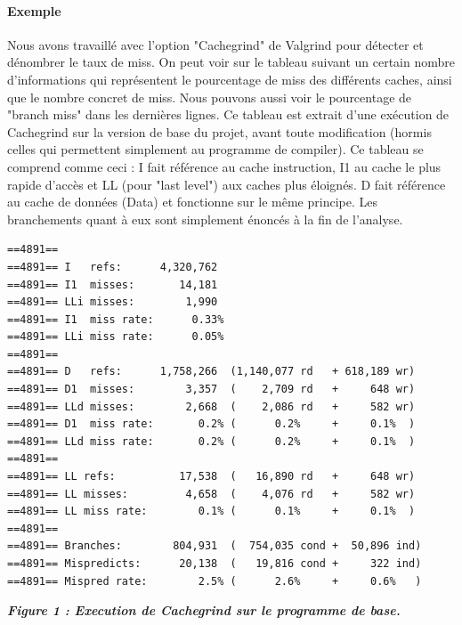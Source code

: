 \documentclass{report}
\begin{document}
\paragraph{Exemple}
Nous avons travaillé avec l'option "Cachegrind" de Valgrind pour détecter et dénombrer le taux de miss.
On peut voir sur le tableau suivant un certain nombre d'informations qui représentent le pourcentage de miss des différents caches, ainsi que le nombre concret de miss. 
Nous pouvons aussi voir le pourcentage de "branch miss" dans les dernières lignes. 
Ce tableau est extrait d'une exécution de Cachegrind sur la version de base du projet, avant toute modification (hormis celles qui permettent simplement au programme de compiler).
Ce tableau se comprend comme ceci :
\newline
I fait référence au cache instruction, I1 au cache le plus rapide d'accès et LL (pour "last level") aux caches plus éloignés.
\newline
D fait référence au cache de données (Data) et fonctionne sur le même principe.
Les branchements quant à eux sont simplement énoncés à la fin de l'analyse.
\newpage
\begin{scriptsize}
\begin{lstlisting}
==4891== 
==4891== I   refs:      4,320,762
==4891== I1  misses:       14,181
==4891== LLi misses:        1,990
==4891== I1  miss rate:      0.33%
==4891== LLi miss rate:      0.05%
==4891== 
==4891== D   refs:      1,758,266  (1,140,077 rd   + 618,189 wr)
==4891== D1  misses:        3,357  (    2,709 rd   +     648 wr)
==4891== LLd misses:        2,668  (    2,086 rd   +     582 wr)
==4891== D1  miss rate:       0.2% (      0.2%     +     0.1%  )
==4891== LLd miss rate:       0.2% (      0.2%     +     0.1%  )
==4891== 
==4891== LL refs:          17,538  (   16,890 rd   +     648 wr)
==4891== LL misses:         4,658  (    4,076 rd   +     582 wr)
==4891== LL miss rate:        0.1% (      0.1%     +     0.1%  )
==4891== 
==4891== Branches:        804,931  (  754,035 cond +  50,896 ind)
==4891== Mispredicts:      20,138  (   19,816 cond +     322 ind)
==4891== Mispred rate:        2.5% (      2.6%     +     0.6%   )
\end{lstlisting}
\begin{center}
\textbf{\textit{Figure 1 : Execution de Cachegrind sur le programme de base.}}
\end{center}
\end{scriptsize}
\end{document}
